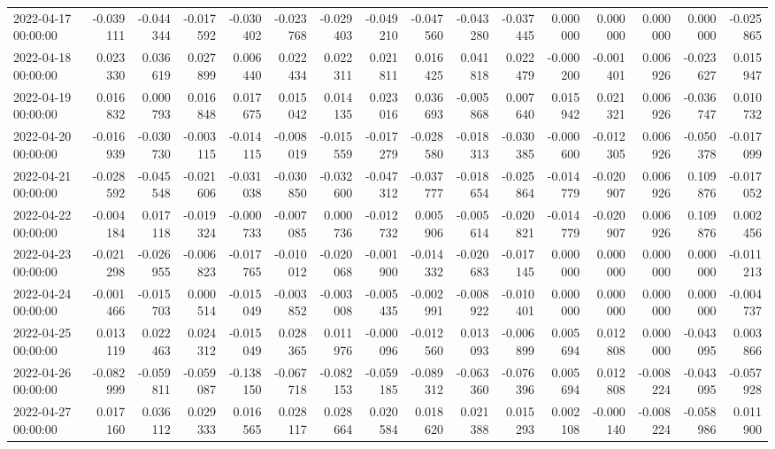 \begin{tabular}{lrrrrrrrrrrrrrrr}
2022-04-17 00:00:00 & -0.039111 & -0.044344 & -0.017592 & -0.030402 & -0.023768 & -0.029403 & -0.049210 & -0.047560 & -0.043280 & -0.037445 & 0.000000 & 0.000000 & 0.000000 & 0.000000 & -0.025865 \\
2022-04-18 00:00:00 & 0.023330 & 0.036619 & 0.027899 & 0.006440 & 0.022434 & 0.022311 & 0.021811 & 0.016425 & 0.041818 & 0.022479 & -0.000200 & -0.001401 & 0.006926 & -0.023627 & 0.015947 \\
2022-04-19 00:00:00 & 0.016832 & 0.000793 & 0.016848 & 0.017675 & 0.015042 & 0.014135 & 0.023016 & 0.036693 & -0.005868 & 0.007640 & 0.015942 & 0.021321 & 0.006926 & -0.036747 & 0.010732 \\
2022-04-20 00:00:00 & -0.016939 & -0.030730 & -0.003115 & -0.014115 & -0.008019 & -0.015559 & -0.017279 & -0.028580 & -0.018313 & -0.030385 & -0.000600 & -0.012305 & 0.006926 & -0.050378 & -0.017099 \\
2022-04-21 00:00:00 & -0.028592 & -0.045548 & -0.021606 & -0.031038 & -0.030850 & -0.032600 & -0.047312 & -0.037777 & -0.018654 & -0.025864 & -0.014779 & -0.020907 & 0.006926 & 0.109876 & -0.017052 \\
2022-04-22 00:00:00 & -0.004184 & 0.017118 & -0.019324 & -0.000733 & -0.007085 & 0.000736 & -0.012732 & 0.005906 & -0.005614 & -0.020821 & -0.014779 & -0.020907 & 0.006926 & 0.109876 & 0.002456 \\
2022-04-23 00:00:00 & -0.021298 & -0.026955 & -0.006823 & -0.017765 & -0.010012 & -0.020068 & -0.001900 & -0.014332 & -0.020683 & -0.017145 & 0.000000 & 0.000000 & 0.000000 & 0.000000 & -0.011213 \\
2022-04-24 00:00:00 & -0.001466 & -0.015703 & 0.000514 & -0.015049 & -0.003852 & -0.003008 & -0.005435 & -0.002991 & -0.008922 & -0.010401 & 0.000000 & 0.000000 & 0.000000 & 0.000000 & -0.004737 \\
2022-04-25 00:00:00 & 0.013119 & 0.022463 & 0.024312 & -0.015049 & 0.028365 & 0.011976 & -0.000096 & -0.012560 & 0.013093 & -0.006899 & 0.005694 & 0.012808 & 0.000000 & -0.043095 & 0.003866 \\
2022-04-26 00:00:00 & -0.082999 & -0.059811 & -0.059087 & -0.138150 & -0.067718 & -0.082153 & -0.059185 & -0.089312 & -0.063360 & -0.076396 & 0.005694 & 0.012808 & -0.008224 & -0.043095 & -0.057928 \\
2022-04-27 00:00:00 & 0.017160 & 0.036112 & 0.029333 & 0.016565 & 0.028117 & 0.028664 & 0.020584 & 0.018620 & 0.021388 & 0.015293 & 0.002108 & -0.000140 & -0.008224 & -0.058986 & 0.011900 \\

\end{tabular}
